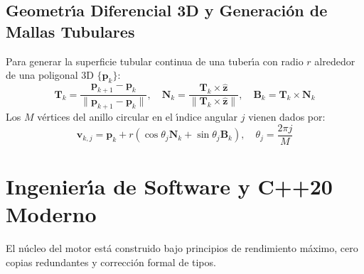 \documentclass[11pt,a4paper]{article}
\begin{document}
\subsection{Geometr{\'\i}a Diferencial 3D y Generaci{\'o}n de Mallas Tubulares}
Para generar la superficie tubular continua de una tuber{\'\i}a con radio $r$ alrededor de una poligonal 3D $\{ \mathbf{p}_k \}$:
\begin{equation}
    \mathbf{T}_k = \frac{\mathbf{p}_{k+1} - \mathbf{p}_k}{\|\mathbf{p}_{k+1} - \mathbf{p}_k\|}, \quad \mathbf{N}_k = \frac{\mathbf{T}_k \times \hat{\mathbf{z}}}{\|\mathbf{T}_k \times \hat{\mathbf{z}}\|}, \quad \mathbf{B}_k = \mathbf{T}_k \times \mathbf{N}_k
\end{equation}
Los $M$ v{\'e}rtices del anillo circular en el {\'\i}ndice angular $j$ vienen dados por:
\begin{equation}
    \mathbf{v}_{k, j} = \mathbf{p}_k + r \left( \cos\theta_j \mathbf{N}_k + \sin\theta_j \mathbf{B}_k \right), \quad \theta_j = \frac{2\pi j}{M}
\end{equation}

\section{Ingenier{\'\i}a de Software y C++20 Moderno}

El n{\'u}cleo del motor est{\'a} construido bajo principios de rendimiento m{\'a}ximo, cero copias redundantes y correcci{\'o}n formal de tipos.
\end{document}

